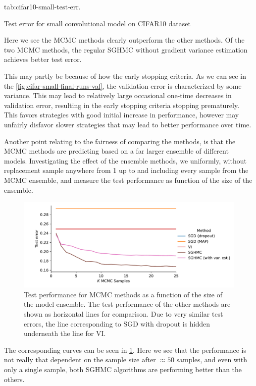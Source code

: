 {tab:cifar10-small-test-err}. 
\begin{table}[htbp]
    \centering
    
    \caption{Test error for small convolutional model on CIFAR10 dataset}
    \label{tab:cifar10-small-test-err}
\end{table}
Here we see the MCMC methods clearly outperform the other methods.
Of the two MCMC methods, the regular SGHMC without gradient variance estimation achieves better test error. 

This may partly be because of how the early stopping criteria.
As we can see in the \cref{fig:cifar-small-final-runs-val}, the validation error is characterized by some variance.
This may lead to relatively large occasional one-time decreases in validation error, resulting in the early stopping criteria stopping prematurely.
This favors strategies with good initial increase in performance, however may unfairly disfavor slower strategies that may lead to better performance over time.

Another point relating to the fairness of comparing the methods, is that the MCMC methods are predicting based on a far larger ensemble of different models.
Investigating the effect of the ensemble methods, we uniformly, without replacement sample anywhere from 1 up to and including every sample from the MCMC ensemble, and measure the test performance as function of the size of the ensemble. 
\begin{figure}[htbp]
    \centering
    \includegraphics[width=\linewidth]{Figures/cifar-small-downsampling.pdf}
    \caption{Test performance for MCMC methods as a function of the size of the model ensemble.
The test performance of the other methods are shown as horizontal lines for comparison.
Due to very similar test errors, the line corresponding to SGD with dropout is hidden underneath the line for VI.}
    \label{fig:cifar-small-downsampling}
\end{figure}
The corresponding curves can be seen in \cref{fig:cifar-small-downsampling}.
Here we see that the performance is not really that dependent on the sample size after $\approx 50$ samples, and even with only a single sample, both SGHMC algorithms are performing better than the others.

